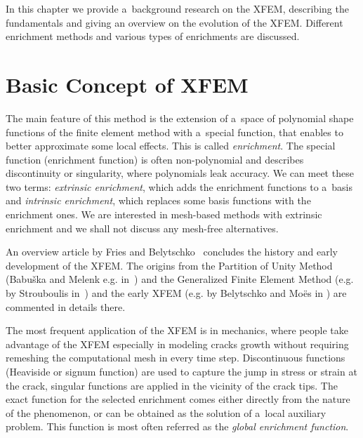 

In this chapter we provide a~background research on the XFEM,
describing the fundamentals and giving an overview on the evolution of the XFEM.
Different enrichment methods and various types of enrichments are discussed.


\section{Basic Concept of XFEM} \label{sec:soa_xfem}

The main feature of this method is the extension of a~space of polynomial shape functions of the finite element
method with a~special function, that enables to better approximate some local effects. This is called \emph{enrichment}.
The special function (enrichment function) is often non-polynomial and describes discontinuity or singularity,
where polynomials leak accuracy. We can meet these two terms: \emph{extrinsic enrichment}, which adds the enrichment
functions to a~basis and \emph{intrinsic enrichment}, which replaces some basis functions with the enrichment ones.
We are interested in mesh-based methods with extrinsic enrichment and we shall not discuss any mesh-free alternatives.

An overview article by Fries and Belytschko~\cite{fries_xfem_overview_2010} concludes the history and early development
of the XFEM. The origins from the Partition of Unity Method (Babu{\v s}ka and Melenk e.g. in~\cite{babuska_partition_1997}) and
the Generalized Finite Element Method (e.g. by Strouboulis in~\cite{strouboulis_generalized_2000}) 
and the early XFEM (e.g. by Belytschko and Mo{\"e}s in \cite{moes_finite_1999}) are commented in details there.

The most frequent application of the XFEM is in mechanics, where people take advantage of the XFEM especially in
modeling cracks growth without requiring remeshing the computational mesh in every time step. 
Discontinuous functions (Heaviside or signum function) are used to capture the jump in stress or strain at the crack,
singular functions are applied in the vicinity of the crack tips. The exact function for the selected enrichment
comes either directly from the nature of the phenomenon, or can be obtained as the solution of a~local auxiliary
problem. This function is most often referred as the \emph{global enrichment function}.

